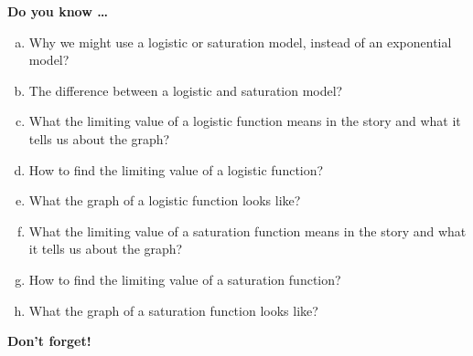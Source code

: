 \newpage



\bigskip

\noindent \textbf{Do you know \ldots} %

\begin{enumerate} [(a)]
\item Why we might use a logistic or saturation model, instead of an exponential model?
\item The difference between a logistic and saturation model?

\item What the limiting value of a logistic function means in the story and what it tells us about the graph? 
\item How to find the limiting value of a logistic function?  
\item What the graph of a logistic function looks like? 

\item What the limiting value of a saturation function means in the story and what it tells us about the graph? 
\item How to find the limiting value of a saturation function?  
\item What the graph of a saturation function looks like? 
\end{enumerate}

\bigskip

\noindent \textbf{Don't forget!}
